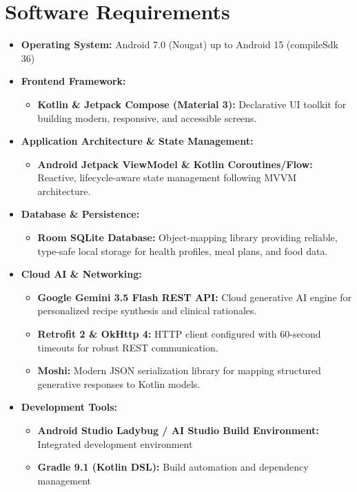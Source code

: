 \documentclass[a4paper,12pt]{report}
\begin{document}
\section{Software Requirements}
\begin{itemize}

\item \textbf{Operating System:} Android 7.0 (Nougat) up to Android 15 (compileSdk 36)

\item \textbf{Frontend Framework:}
\begin{itemize}
    \item \textbf{Kotlin \& Jetpack Compose (Material 3):} Declarative UI toolkit for building modern, responsive, and accessible screens.
\end{itemize}

\item \textbf{Application Architecture \& State Management:}
\begin{itemize}
    \item \textbf{Android Jetpack ViewModel \& Kotlin Coroutines/Flow:} Reactive, lifecycle-aware state management following MVVM architecture.
\end{itemize}

\item \textbf{Database \& Persistence:}
\begin{itemize}
    \item \textbf{Room SQLite Database:} Object-mapping library providing reliable, type-safe local storage for health profiles, meal plans, and food data.
\end{itemize}

\item \textbf{Cloud AI \& Networking:}
\begin{itemize}
    \item \textbf{Google Gemini 3.5 Flash REST API:} Cloud generative AI engine for personalized recipe synthesis and clinical rationales.
    \item \textbf{Retrofit 2 \& OkHttp 4:} HTTP client configured with 60-second timeouts for robust REST communication.
    \item \textbf{Moshi:} Modern JSON serialization library for mapping structured generative responses to Kotlin models.
\end{itemize}

\item \textbf{Development Tools:}
\begin{itemize}
    \item \textbf{Android Studio Ladybug / AI Studio Build Environment:} Integrated development environment
    \item \textbf{Gradle 9.1 (Kotlin DSL):} Build automation and dependency management
\end{itemize}

\end{itemize}
\end{document}
